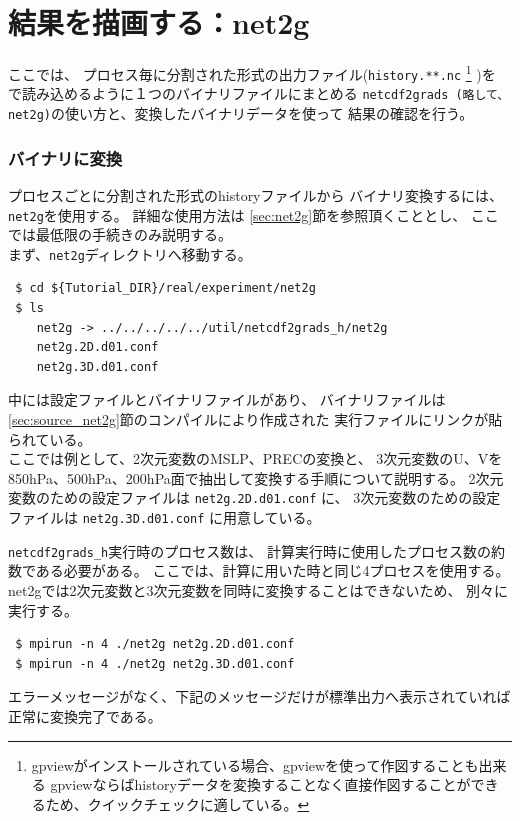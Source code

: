 \section{結果を描画する：net2g} \label{sec:quicklook}

ここでは、
プロセス毎に分割された{\netcdf}形式の出力ファイル(\verb|history.**.nc|
\footnote{gpviewがインストールされている場合、gpviewを使って作図することも出来る
gpviewならばhistoryデータを変換することなく直接作図することができるため、クイックチェックに適している。}
)を
{\grads}で読み込めるように１つのバイナリファイルにまとめる
\verb|netcdf2grads (略して、net2g)|の使い方と、変換した{\grads}バイナリデータを使って
結果の確認を行う。


\subsubsection{{\grads}バイナリに変換}
プロセスごとに分割された{\netcdf}形式のhistoryファイルから
{\grads}バイナリ変換するには、\verb|net2g|を使用する。
詳細な使用方法は \ref{sec:net2g}節を参照頂くこととし、
ここでは最低限の手続きのみ説明する。\\

まず、\verb|net2g|ディレクトリへ移動する。
\begin{verbatim}
 $ cd ${Tutorial_DIR}/real/experiment/net2g
 $ ls
    net2g -> ../../../../../util/netcdf2grads_h/net2g
    net2g.2D.d01.conf
    net2g.3D.d01.conf
\end{verbatim}
中には設定ファイルとバイナリファイルがあり、
バイナリファイルは\ref{sec:source_net2g}節のコンパイルにより作成された
実行ファイルにリンクが貼られている。\\

ここでは例として、2次元変数のMSLP、PRECの変換と、
3次元変数のU、Vを850hPa、500hPa、200hPa面で抽出して変換する手順について説明する。
2次元変数のための設定ファイルは \verb|net2g.2D.d01.conf| に、
3次元変数のための設定ファイルは \verb|net2g.3D.d01.conf| に用意している。

\verb|netcdf2grads_h|実行時のプロセス数は、
計算実行時に使用したプロセス数の約数である必要がある。
ここでは、計算に用いた時と同じ4プロセスを使用する。
net2gでは2次元変数と3次元変数を同時に変換することはできないため、
別々に実行する。
\begin{verbatim}
 $ mpirun -n 4 ./net2g net2g.2D.d01.conf
 $ mpirun -n 4 ./net2g net2g.3D.d01.conf
\end{verbatim}
エラーメッセージがなく、下記のメッセージだけが標準出力へ表示されていれば正常に変換完了である。\\

